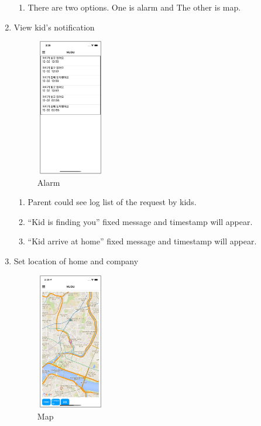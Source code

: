 \documentclass[conference]{IEEEtran}
\begin{document}
\begin{enumerate}
    \begin{enumerate}
        \item There are two options. One is alarm and The other is map.\\
    \end{enumerate}
    \item View kid’s notification
    \begin{figure}[htbp]
    \centerline{\includegraphics[width=3cm, height=6cm]{images/figure3.png}}
    \caption{Alarm}
    \end{figure}
    \begin{enumerate}
        \item Parent could see log list of the request by kids.
        \item “Kid is finding you” fixed message and timestamp will appear.
        \item “Kid arrive at home” fixed message and timestamp will appear.\\
    \end{enumerate}
    \item Set location of home and company 
    \begin{figure}[htbp]
    \centerline{\includegraphics[width=3cm, height=6cm]{images/figure4.png}}
    \caption{Map}
    \end{figure}
    \begin{enumerate}

\end{enumerate}
\end{enumerate}
\end{document}

